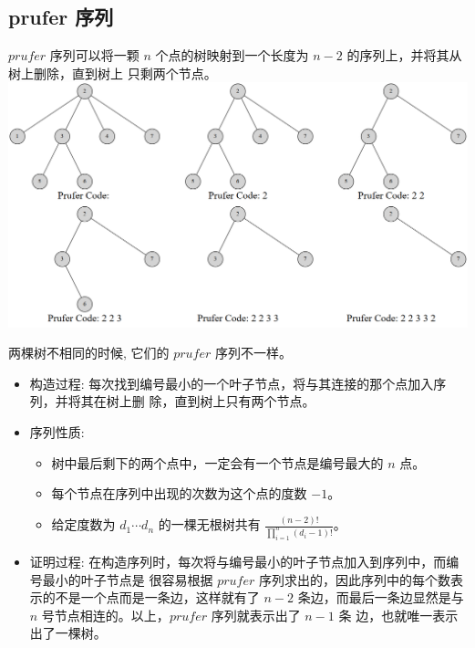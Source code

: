 \documentclass[a4paper,12pt]{article}
\begin{document}
\subsection{prufer 序列}

\noindent \(prufer\) 序列可以将一颗 \(n\) 个点的树映射到一个长度为 \(n - 2\) 的序列上，并将其从树上删除，直到树上
只剩两个节点。
\\

\includegraphics[scale=0.3]{prufer1.png}

\noindent 两棵树不相同的时候, 它们的 \(prufer\) 序列不一样。

\begin{itemize}
\item 构造过程: 每次找到编号最小的一个叶子节点，将与其连接的那个点加入序列，并将其在树上删
除，直到树上只有两个节点。

\item 序列性质: 
\begin{itemize}
    \item 树中最后剩下的两个点中，一定会有一个节点是编号最大的 \(n\) 点。
    \item 每个节点在序列中出现的次数为这个点的度数 \(-1\)。
    \item 给定度数为 \(d_1 \cdots d_n\) 的一棵无根树共有 \(\frac{(n-2)!}{\prod_{i=1}^{n} (d_i - 1)!}\)。
\end{itemize}

\item 证明过程:
在构造序列时，每次将与编号最小的叶子节点加入到序列中，而编号最小的叶子节点是
很容易根据 \(prufer\) 序列求出的，因此序列中的每个数表示的不是一个点而是一条边，这样就有了 \(n-2\)
条边，而最后一条边显然是与 \(n\) 号节点相连的。以上，\(prufer\) 序列就表示出了 \(n-1\) 条
边，也就唯一表示出了一棵树。
\end{itemize}
\end{document}
